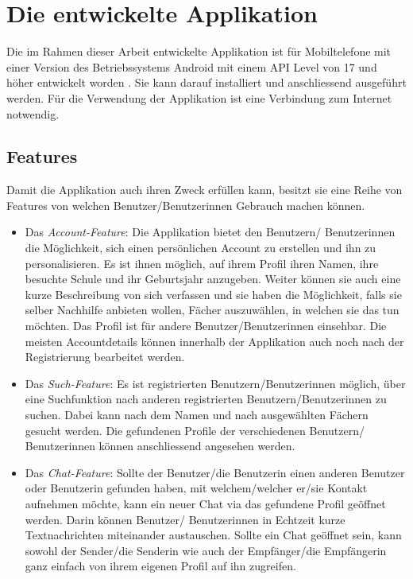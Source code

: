 \documentclass[../main.tex]{subfiles}
\begin{document}
\chapter{Die entwickelte Applikation} \label{studnetzApplikation}
Die im Rahmen dieser Arbeit entwickelte Applikation ist für Mobiltelefone mit einer Version des Betriebssystems Android mit einem API Level von 17 und höher entwickelt worden \cite{android:APILevel}. Sie kann darauf installiert und anschliessend ausgeführt werden. Für die Verwendung der Applikation ist eine Verbindung zum Internet notwendig.

\section{Features}
Damit die Applikation auch ihren Zweck erfüllen kann, besitzt sie eine Reihe von Features von welchen Benutzer/Benutzerinnen Gebrauch machen können.

\sloppy
\begin{itemize}
	\item Das \emph{Account-Feature}: Die Applikation bietet den Benutzern/ Benutzerinnen die Möglichkeit, sich einen persönlichen Account zu erstellen und ihn zu personalisieren. Es ist ihnen möglich, auf ihrem Profil ihren Namen, ihre besuchte Schule und ihr Geburtsjahr anzugeben. Weiter können sie auch eine kurze Beschreibung von sich verfassen und sie haben die Möglichkeit, falls sie selber Nachhilfe anbieten wollen, Fächer auszuwählen, in welchen sie das tun möchten. Das Profil ist für andere Benutzer/Benutzerinnen einsehbar. Die meisten Accountdetails können innerhalb der Applikation auch noch nach der Registrierung bearbeitet werden.
	\item Das \emph{Such-Feature}: Es ist registrierten Benutzern/Benutzerinnen möglich, über eine Suchfunktion nach anderen registrierten Benutzern/Benutzerinnen zu suchen. Dabei kann nach dem Namen und nach ausgewählten Fächern gesucht werden. Die gefundenen Profile der verschiedenen Benutzern/ Benutzerinnen können anschliessend angesehen werden.
	\item Das \emph{Chat-Feature}: Sollte der Benutzer/die Benutzerin einen anderen Benutzer oder Benutzerin gefunden haben, mit welchem/welcher er/sie Kontakt aufnehmen möchte, kann ein neuer Chat via das gefundene Profil geöffnet werden. Darin können Benutzer/ Benutzerinnen in Echtzeit kurze Textnachrichten miteinander austauschen. Sollte ein Chat geöffnet sein, kann sowohl der Sender/die Senderin wie auch der Empfänger/die Empfängerin ganz einfach von ihrem eigenen Profil auf ihn zugreifen.
\end{itemize}
\fussy
\end{document}
